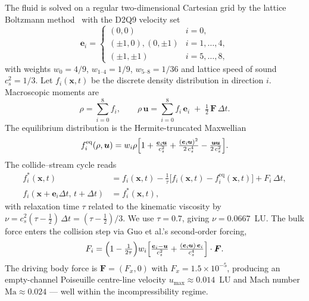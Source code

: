 \documentclass[11pt,a4paper]{article}
\begin{document}
The fluid is solved on a regular two-dimensional Cartesian grid by
the lattice Boltzmann method~\citep{kruger2017lattice} with the
D2Q9 velocity set
\begin{equation}
\boldsymbol e_i =
\begin{cases}
(0,0)                 & i = 0,\\
(\pm 1, 0),(0,\pm 1)  & i = 1,\dots,4,\\
(\pm 1, \pm 1)        & i = 5,\dots,8,
\end{cases}
\label{eq:d2q9}
\end{equation}
with weights $w_0 = 4/9$, $w_{1\text{--}4} = 1/9$,
$w_{5\text{--}8} = 1/36$ and lattice speed of sound
$c_s^2 = 1/3$. Let $f_i(\boldsymbol x, t)$ be the discrete density
distribution in direction $i$. Macroscopic moments are
\begin{equation}
\rho = \sum_{i=0}^{8} f_i,
\qquad
\rho\,\boldsymbol u =
   \sum_{i=0}^{8} f_i\,\boldsymbol e_i
   \;+\; \tfrac{1}{2}\,\boldsymbol F\,\Delta t.
\label{eq:moments}
\end{equation}
The equilibrium distribution is the Hermite-truncated Maxwellian
\begin{equation}
f_i^{\text{eq}}(\rho,\boldsymbol u) =
   w_i \rho
   \Bigl[
     1
     + \tfrac{\boldsymbol e_i \!\cdot\! \boldsymbol u}{c_s^2}
     + \tfrac{(\boldsymbol e_i \!\cdot\! \boldsymbol u)^2}{2\,c_s^4}
     - \tfrac{\boldsymbol u \!\cdot\! \boldsymbol u}{2\,c_s^2}
   \Bigr].
\label{eq:feq}
\end{equation}
The collide--stream cycle reads
\begin{align}
f_i^{*}(\boldsymbol x, t)
   &= f_i(\boldsymbol x, t)
   - \tfrac{1}{\tau}
     \bigl[ f_i(\boldsymbol x, t) - f_i^{\text{eq}}(\boldsymbol x, t) \bigr]
   + F_i\,\Delta t,
\label{eq:bgk-collision}
\\
f_i(\boldsymbol x + \boldsymbol e_i \Delta t,\, t + \Delta t)
   &= f_i^{*}(\boldsymbol x, t),
\label{eq:streaming}
\end{align}
with relaxation time $\tau$ related to the kinematic viscosity by
$\nu = c_s^2(\tau - \tfrac{1}{2})\,\Delta t = (\tau - \tfrac{1}{2})/3$.
We use $\tau = 0.7$, giving $\nu = 0.0667$~LU.
The bulk force enters the collision step via Guo et al.'s
second-order forcing,
\begin{equation}
F_i =
   \Bigl( 1 - \tfrac{1}{2\tau} \Bigr)
   w_i
   \Bigl[
     \tfrac{\boldsymbol e_i - \boldsymbol u}{c_s^2}
     + \tfrac{(\boldsymbol e_i \!\cdot\! \boldsymbol u)\,\boldsymbol e_i}{c_s^4}
   \Bigr] \cdot \boldsymbol F.
\label{eq:guo-forcing}
\end{equation}
The driving body force is $\boldsymbol F = (F_x, 0)$ with
$F_x = 1.5\times 10^{-5}$, producing an empty-channel
Poiseuille centre-line velocity $u_{\max} \approx 0.014$~LU and
Mach number $\mathrm{Ma} \approx 0.024$ --- well within the
incompressibility regime.
\end{document}
